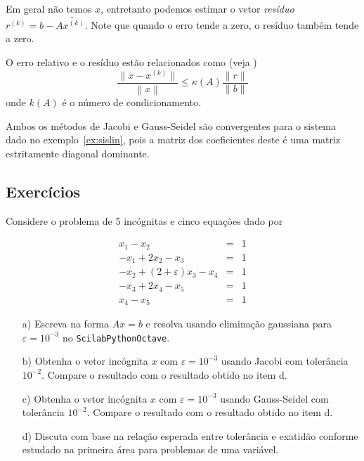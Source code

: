 Em geral não temos $x$, entretanto podemos estimar o vetor \emph{resíduo} $r^{(k)}=b-A\tilde{x^{(k)}}$. Note que quando o erro tende a zero, o resíduo também tende a zero. 

\begin{teo}
 O erro relativo e o resíduo estão relacionados como (veja \cite{Burden2013})
\begin{equation*}
  \frac{ \|x-x^{(k)}\|}{\left\|x\right\|} \leq  \kappa(A) \frac{\|r\|}{\|b\|}
\end{equation*}
onde $k(A)$ é o número de condicionamento.
\end{teo}

\begin{ex}
  Ambos os métodos de Jacobi e Gauss-Seidel são convergentes para o sistema dado no exemplo~\ref{ex:sislin}, pois a matriz dos coeficientes deste é uma matriz estritamente diagonal dominante.
\end{ex}

\subsection*{Exercícios}

\begin{exer} Considere o problema de 5 incógnitas e cinco equações dado por

\begin{eqnarray*}
x_1-x_2&=&1\\
-x_{1}+2x_2-x_{3}&=&1\\
-x_{2}+(2+\varepsilon) x_3-x_{4}&=&1\\
-x_{3}+2x_4-x_{5}&=&1\\
x_{4}-x_{5}&=&1
\end{eqnarray*}
\begin{itemize}
\item[a)]  Escreva na forma $Ax=b$ e resolva usando eliminação gaussiana para $\varepsilon=10^{-3}$ no \ifisscilab\verb+Scilab+\fi\ifispython\verb+Python+\fi\ifisoctave\verb+Octave+\fi.
\item[b)]  Obtenha o vetor incógnita $x$ com $\varepsilon=10^{-3}$ usando Jacobi com tolerância $10^{-2}$. Compare o resultado com o resultado obtido no item d.
\item[c)]  Obtenha o vetor incógnita $x$ com $\varepsilon=10^{-3}$ usando Gauss-Seidel com tolerância $10^{-2}$. Compare o resultado com o resultado obtido no item d.
\item[d)]  Discuta com base na relação esperada entre tolerância e exatidão conforme estudado na primeira área para problemas de uma variável.
\end{itemize}

\end{exer}

